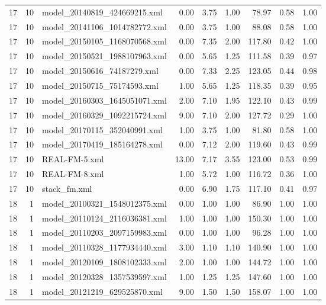 \begin{table}[ht]
\begin{tabular}{rrlrrrrrr}
   17 &  10 & model\_20140819\_424669215.xml & 0.00 & 3.75 & 1.00 & 78.97 & 0.58 & 1.00 \\ 
   17 &  10 & model\_20141106\_1014782772.xml & 0.00 & 3.75 & 1.00 & 88.08 & 0.58 & 1.00 \\ 
   17 &  10 & model\_20150105\_1168070568.xml & 0.00 & 7.35 & 2.00 & 117.80 & 0.42 & 1.00 \\ 
   17 &  10 & model\_20150521\_1988107963.xml & 0.00 & 5.65 & 1.25 & 111.58 & 0.39 & 0.97 \\ 
   17 &  10 & model\_20150616\_74187279.xml & 0.00 & 7.33 & 2.25 & 123.05 & 0.44 & 0.98 \\ 
   17 &  10 & model\_20150715\_75174593.xml & 1.00 & 5.65 & 1.25 & 118.35 & 0.39 & 0.95 \\ 
   17 &  10 & model\_20160303\_1645051071.xml & 2.00 & 7.10 & 1.95 & 122.10 & 0.43 & 0.99 \\ 
   17 &  10 & model\_20160329\_1092215724.xml & 9.00 & 7.10 & 2.00 & 127.72 & 0.29 & 1.00 \\ 
   17 &  10 & model\_20170115\_352040991.xml & 1.00 & 3.75 & 1.00 & 81.80 & 0.58 & 1.00 \\ 
   17 &  10 & model\_20170419\_185164278.xml & 0.00 & 7.12 & 2.00 & 119.60 & 0.43 & 0.99 \\ 
   17 &  10 & REAL-FM-5.xml & 13.00 & 7.17 & 3.55 & 123.00 & 0.53 & 0.99 \\ 
   17 &  10 & REAL-FM-8.xml & 1.00 & 5.72 & 1.00 & 116.72 & 0.36 & 1.00 \\ 
   17 &  10 & stack\_fm.xml & 0.00 & 6.90 & 1.75 & 117.10 & 0.41 & 0.97 \\ 
   18 &   1 & model\_20100321\_1548012375.xml & 0.00 & 1.00 & 1.00 & 86.90 & 1.00 & 1.00 \\ 
   18 &   1 & model\_20110124\_2116036381.xml & 1.00 & 1.00 & 1.00 & 150.30 & 1.00 & 1.00 \\ 
   18 &   1 & model\_20110203\_2097159983.xml & 0.00 & 1.00 & 1.00 & 96.28 & 1.00 & 1.00 \\ 
   18 &   1 & model\_20110328\_1177934440.xml & 3.00 & 1.10 & 1.10 & 140.90 & 1.00 & 1.00 \\ 
   18 &   1 & model\_20120109\_1808102333.xml & 2.00 & 1.00 & 1.00 & 144.72 & 1.00 & 1.00 \\ 
   18 &   1 & model\_20120328\_1357539597.xml & 1.00 & 1.25 & 1.25 & 147.60 & 1.00 & 1.00 \\ 
   18 &   1 & model\_20121219\_629525870.xml & 9.00 & 1.50 & 1.50 & 158.07 & 1.00 & 1.00 \\ 

\end{tabular}
\end{table}

